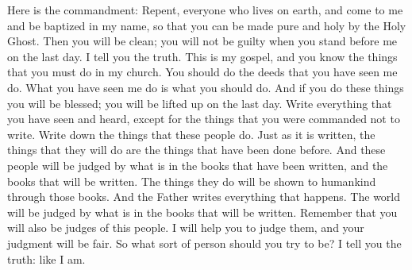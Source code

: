 Here is the commandment: Repent, everyone who lives on earth, and come to me and be baptized in my name, so that you can be made pure and holy by the Holy Ghost. Then you will be clean; you will not be guilty when you stand before me on the last day.
\bverse \iffalse Verily, verily, I say unto you, this is my gospel; and ye know the things that ye must do in my church; for the works which ye have seen me do that shall ye also do; for that which ye have seen me do even that shall ye do; \fi
I tell you the truth. This is my gospel, and you know the things that you must do in my church. You should do the deeds that you have seen me do. What you have seen me do is what you should do.
\bverse \iffalse Therefore, if ye do these things blessed are ye, for ye shall be lifted up at the last day. \fi
And if you do these things you will be blessed; you will be lifted up on the last day.
\bverse \iffalse Write the things which ye have seen and heard, save it be those which are forbidden. \fi
Write everything that you have seen and heard, except for the things that you were commanded not to write.
\bverse \iffalse Write the works of this people, which shall be, even as hath been written, of that which hath been. \fi
Write down the things that these people do. Just as it is written, the things that they will do are the things that have been done before.
\bverse \iffalse For behold, out of the books which have been written, and which shall be written, shall this people be judged, for by them shall their works be known unto men. \fi
And these people will be judged by what is in the books that have been written, and the books that will be written. The things they do will be shown to humankind through those books.
\bverse \iffalse And behold, all things are written by the Father; therefore out of the books which shall be written shall the world be judged. \fi
And the Father writes everything that happens. The world will be judged by what is in the books that will be written.
\bverse \iffalse And know ye that ye shall be judges of this people, according to the judgment which I shall give unto you, which shall be just. Therefore, what manner of men ought ye to be? Verily I say unto you, even as I am. \fi
Remember that you will also be judges of this people. I will help you to judge them, and your judgment will be fair. So what sort of person should you try to be? I tell you the truth: like I am.
\bverse \iffalse And now I go unto the Father. And verily I say unto you, whatsoever things ye shall ask the Father in my name shall be given unto you. \fi
